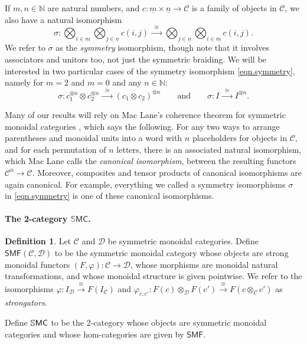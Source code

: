 \documentclass[11pt, oneside, article]{memoir}
\theoremstyle{plain}
\theoremstyle{definition}
\newtheorem{definition}[theorem]{Definition}
\theoremstyle{remark}
\newcommand{\ord}[1]{\underline{#1}}%
\newcommand{\cat}[1]{\mathcal{#1}}%
\newcommand{\Cat}[1]{{\mathsf{#1}}}%
\newcommand{\CCat}[1]{\mathbb{\StrLeft{#1}{1}}\Cat{\StrGobbleLeft{#1}{1}}}%
\newcommand{\tpow}[1]{^{\otimes #1}}
\newcommand{\smf}{\Cat{SMF}}
\newcommand{\ssmc}{\CCat{SMC}}
\newcommand{\nn}{\mathbb{N}}
\newcommand{\To}[1]{\xrightarrow{#1}}
\newcommand{\Too}[1]{\To{\;\;#1\;\;}}
\newcommand{\qqand}{\qquad\text{and}\qquad}
\begin{document}
If $m,n\in\nn$ are natural numbers, and $c\colon \ord{m}\times \ord{n}\to\cat{C}$ is a family of objects in $\cat{C}$, we also have a natural isomorphism
\begin{equation}\label{eqn.symmetry}
\sigma\colon
\bigotimes_{i\in\ord{m}}\bigotimes_{j\in\ord{n}}c(i,j)\Too{\cong}
\bigotimes_{j\in\ord{n}}\bigotimes_{i\in\ord{m}}c(i,j).
\end{equation}
We refer to $\sigma$ as the \emph{symmetry} isomorphism, though note that it involves associators and unitors too, not just the symmetric braiding. We will be interested in two particular cases of the symmetry isomorphism \cref{eqn.symmetry}, namely for $m=2$ and $m=0$ and any $n\in\nn$:
\[\sigma\colon c_1\tpow{n}\otimes c_2\tpow{n}\Too{\cong}(c_1\otimes c_2)\tpow{n}
\qqand
\sigma\colon I\Too{\cong} I\tpow{n}.
\]

Many of our results will rely on Mac Lane's coherence theorem for symmetric monoidal categories \cite[Theorem XI.1]{MacLane:1998a}, which says the following. For any two ways to arrange parentheses and monoidal units into a word with $n$ placeholders for objects in $\cat{C}$, and for each permutation of $n$ letters, there is an associated natural isomorphism, which Mac Lane calls the \emph{canonical isomorphism}, between the resulting functors $\cat{C}^n\to\cat{C}$. Moreover, composites and tensor products of canonical isomorphisms are again canonical. For example, everything we called a symmetry isomorphisms $\sigma$ in \cref{eqn.symmetry} is one of these canonical isomorphisms.

\paragraph{The 2-category $\mathbb{S}\Cat{MC}$.}

\begin{definition}\label{def.smf}
Let $\cat{C}$ and $\cat{D}$ be symmetric monoidal categories. Define $\smf(\cat{C},\cat{D})$ to be the symmetric monoidal category whose objects are strong monoidal functors $(F,\varphi)\colon\cat{C}\to\cat{D}$, whose morphisms are monoidal natural transformations, and whose monoidal structure is given pointwise. We refer to the isomorphisms $\varphi\colon I_{\cat{D}}\To{\cong} F(I_{\cat{C}})$ and $\varphi_{c,c'}\colon F(c)\otimes_{\cat{D}} F(c')\To{\cong} F(c\otimes_{\cat{C}} c')$ as \emph{strongators}.

Define $\ssmc$ to be the 2-category whose objects are symmetric monoidal categories and whose hom-categories are given by $\smf$.
\end{definition}
\end{document}
